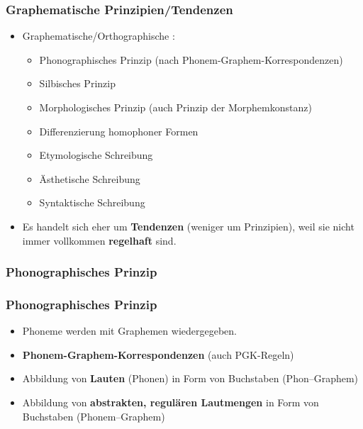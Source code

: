 \begin{frame}
\frametitle{Graphematische Prinzipien/Tendenzen}

\begin{itemize}
	\item Graphematische/Orthographische :
	
	\begin{itemize}
		\item Phonographisches Prinzip (nach Phonem-Graphem-Korrespondenzen)

		\item Silbisches Prinzip

		\item Morphologisches Prinzip (auch Prinzip der Morphemkonstanz)

		\item Differenzierung homophoner Formen

		\item Etymologische Schreibung

		\item Ästhetische Schreibung 

		\item Syntaktische Schreibung 
	\end{itemize}

\item  Es handelt sich eher um \textbf{Tendenzen} (weniger um Prinzipien), weil sie nicht immer vollkommen \textbf{regelhaft} sind.

\end{itemize}


\end{frame}


\subsubsection{Phonographisches Prinzip}

\begin{frame}
\frametitle{Phonographisches Prinzip}

\begin{itemize}
	\item Phoneme werden mit Graphemen wiedergegeben.
	\item \textbf{Phonem-Graphem-Korrespondenzen} (auch PGK-Regeln)

\pause	

	\item Abbildung von \textbf{Lauten} (Phonen) in Form von Buchstaben (Phon--Graphem)\\ 
	\vs
	\item Abbildung von \textbf{abstrakten, regulären Lautmengen} in
Form von Buchstaben (Phonem--Graphem)

\end{itemize}

\end{frame}



